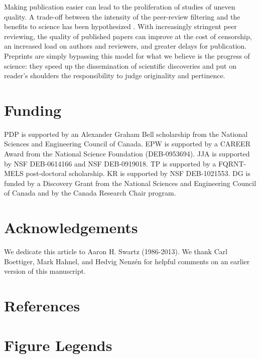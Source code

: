 \documentclass[10pt]{article}
\begin{document}
Making publication easier can lead to the proliferation of studies of uneven
quality. A trade-off between the intensity of the peer-review filtering and the
benefits to science has been hypothesized \cite{Aarssen2012}.  With increasingly
stringent peer reviewing, the quality of published papers can improve at the
cost of censorship, an increased load on authors and reviewers, and greater
delays for publication.  Preprints are simply bypassing this model for what we
believe is the progress of science: they speed up the dissemination of
scientific discoveries and put on reader's shoulders the responsibility to judge
originality and pertinence.

\section*{Funding}

PDP is supported by an Alexander Graham Bell scholarship from the National
Sciences and Engineering Council of Canada. EPW is supported by a CAREER Award
from the National Science Foundation (DEB-0953694). JJA is supported by NSF
DEB-0614166 and NSF DEB-0919018.  TP is supported by a FQRNT-MELS post-doctoral
scholarship. KR is supported by NSF DEB-1021553. DG is funded by a Discovery
Grant from the National Sciences and Engineering Council of Canada and by the
Canada Research Chair program.

\section*{Acknowledgements}

We dedicate this article to Aaron H. Swartz (1986-2013).  We thank Carl
Boettiger, Mark Hahnel, and Hedvig Nenz\'en for helpful comments on an earlier
version of this manuscript.

\section*{References}


\newpage
\section*{Figure Legends}
\end{document}
